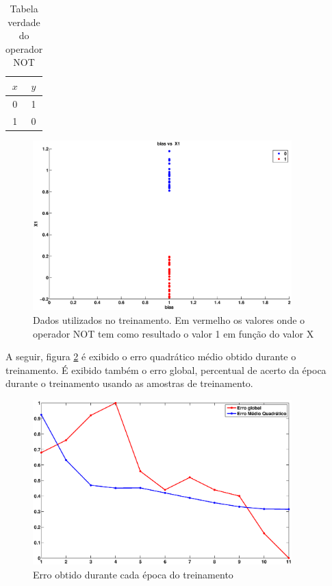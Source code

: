\documentclass[12pt,journal,onecolumn]{IEEEtran}
\begin{document}
\begin{table}[!htbp]
\caption{Tabela verdade do operador NOT}
\label{tab:verd_NOT}
\centering
	\begin{tabular}{| c | c |}
		\hline
		 $x$ 	& $y$ \\ \hline
		 0      & 1 \\ \hline
		 1 		& 0 \\ \hline

		\hline
	\end{tabular}
\end{table}


\begin{figure}[!htbp]
	\centering
	\includegraphics[width=10cm, trim = 3cm 1cm 3cm 1cm, clip=true
	]{eps/not/NOTDesired.eps}
	\caption{Dados utilizados no treinamento. Em vermelho os valores onde o
	operador NOT tem como resultado o valor 1 em função do valor X}
	\label{fig:NOT_dados}
\end{figure} 

A seguir, figura \ref{fig:Not_err} é exibido o erro quadrático médio obtido
durante o treinamento.
É exibido também o erro global, percentual de acerto da época durante o
treinamento usando as amostras de treinamento.
\begin{figure}[!htbp]
	\centering
	\includegraphics[width=10cm, trim = 3cm 1cm 3cm 1cm, clip=true
	]{eps/not/notErr.eps}
	\caption{Erro obtido durante cada época do treinamento}
	\label{fig:Not_err}
\end{figure} 
\end{document}
